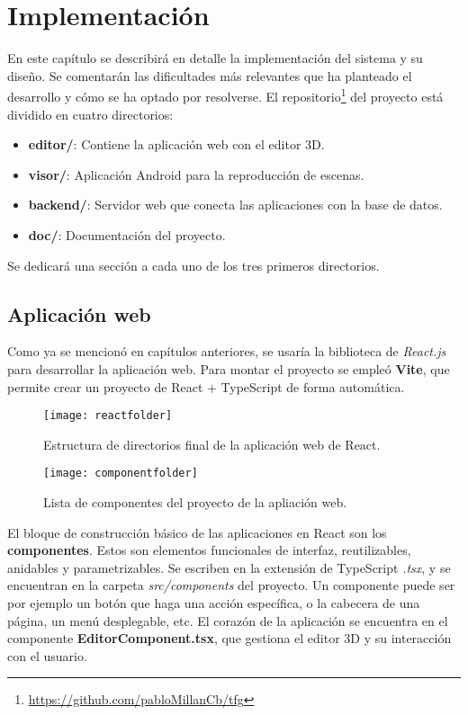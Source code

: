 \chapter{Implementación}

En este capítulo se describirá en detalle la implementación del sistema y su diseño. Se comentarán las dificultades más relevantes que ha planteado el desarrollo y cómo se ha optado por resolverse. El repositorio\footnote{\url{https://github.com/pabloMillanCb/tfg}} del proyecto está dividido en cuatro directorios:

\begin{itemize}
    \item \textbf{editor/}: Contiene la aplicación web con el editor 3D.
    \item \textbf{visor/}: Aplicación Android para la reproducción de escenas.
    \item \textbf{backend/}: Servidor web que conecta las aplicaciones con la base de datos.
    \item \textbf{doc/}: Documentación del proyecto.
\end{itemize}

Se dedicará una sección a cada uno de los tres primeros directorios.


\section{Aplicación web}

Como ya se mencionó en capítulos anteriores, se usaría la biblioteca de \textit{React.js}\cite{react} para desarrollar la aplicación web. Para montar el proyecto se empleó \textbf{Vite}\cite{vite}, que permite crear un proyecto de React + TypeScript de forma automática.

\begin{figure}[h]
    \centering
    \texttt{[image: reactfolder]}
    \caption[Estructura de directorios de React]{Estructura de directorios final de la aplicación web de React.}
\end{figure}

\begin{figure}[h]
    \centering
    \texttt{[image: componentfolder]}
    \caption[Componentes del proyecto React]{Lista de componentes del proyecto de la apliación web.}
\end{figure}

El bloque de construcción básico de las aplicaciones en React son los \textbf{componentes}. Estos son elementos funcionales de interfaz, reutilizables, anidables y parametrizables. Se escriben en la extensión de TypeScript \textit{.tsx}, y se encuentran en la carpeta \textit{src/components} del proyecto. Un componente puede ser por ejemplo un botón que haga una acción específica, o la cabecera de una página, un menú desplegable, etc. El corazón de la aplicación se encuentra en el componente \textbf{EditorComponent.tsx}, que gestiona el editor 3D y su interacción con el usuario.

